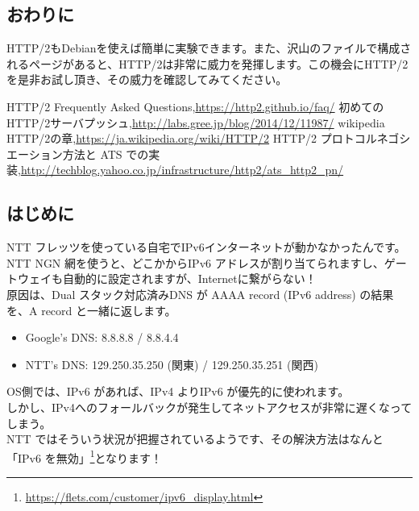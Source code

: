 \documentclass[mingoth,a4paper]{jsarticle}
\begin{document}
\subsection{おわりに}

  HTTP/2もDebianを使えば簡単に実験できます。また、沢山のファイルで構成されるページがあると、HTTP/2は非常に威力を発揮します。この機会にHTTP/2を是非お試し頂き、その威力を確認してみてください。
  
\begin{thebibliography}{9}
 HTTP/2 Frequently Asked Questions,\url{https://http2.github.io/faq/}
 初めてのHTTP/2サーバプッシュ,\url{http://labs.gree.jp/blog/2014/12/11987/}
 wikipedia HTTP/2の章,\url{https://ja.wikipedia.org/wiki/HTTP/2}
 HTTP/2 プロトコルネゴシエーション方法と ATS での実装,\url{http://techblog.yahoo.co.jp/infrastructure/http2/ats_http2_pn/}
\end{thebibliography}

\subsection{はじめに}
NTT フレッツを使っている自宅でIPv6インターネットが動かなかったんです。
\\
NTT NGN 網を使うと、どこかからIPv6 アドレスが割り当てられますし、ゲートウェイも自動的に設定されますが、Internetに繋がらない！
\\
原因は、Dual スタック対応済みDNS が AAAA record (IPv6 address) の結果を、A record と一緒に返します。
\begin{itemize}
\item Google’s DNS: 8.8.8.8 / 8.8.4.4
\item NTT’s DNS: 129.250.35.250 (関東) / 129.250.35.251 (関西)
\end{itemize}
OS側では、IPv6 があれば、IPv4 よりIPv6 が優先的に使われます。
\\
しかし、IPv4へのフォールバックが発生してネットアクセスが非常に遅くなってしまう。
\\
NTT ではそういう状況が把握されているようです、その解決方法はなんと「IPv6 を無効」\footnote{\url{https://flets.com/customer/ipv6_display.html}}となります！
\\
\end{document}
